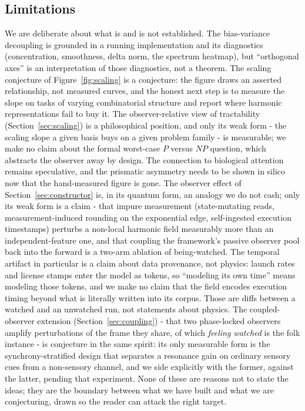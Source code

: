 \subsection{Limitations}

We are deliberate about what is and is not established. The bias-variance decoupling is grounded in a running implementation and its diagnostics (concentration, smoothness, delta norm, the spectrum heatmap), but ``orthogonal axes'' is an interpretation of those diagnostics, not a theorem. The scaling conjecture of Figure~\ref{fig:scaling} is a conjecture: the figure draws an asserted relationship, not measured curves, and the honest next step is to measure the slope on tasks of varying combinatorial structure and report where harmonic representations fail to buy it. The observer-relative view of tractability (Section~\ref{sec:scaling}) is a philosophical position, and only its weak form - the scaling slope a given basis buys on a given problem family - is measurable; we make no claim about the formal worst-case $P$ versus $NP$ question, which abstracts the observer away by design. The connection to biological attention remains speculative, and the prismatic asymmetry needs to be shown in silico now that the hand-measured figure is gone. The observer effect of Section~\ref{sec:constructor} is, in its quantum form, an analogy we do not cash; only its weak form is a claim - that impure measurement (state-mutating reads, measurement-induced rounding on the exponential edge, self-ingested execution timestamps) perturbs a non-local harmonic field measurably more than an independent-feature one, and that coupling the framework's passive observer pool back into the forward is a two-arm ablation of being-watched. The temporal artifact in particular is a claim about data provenance, not physics: launch rates and license stamps enter the model as tokens, so ``modeling its own time'' means modeling those tokens, and we make no claim that the field encodes execution timing beyond what is literally written into its corpus. Those are diffs between a watched and an unwatched run, not statements about physics. The coupled-observer extension (Section~\ref{sec:coupling}) - that two phase-locked observers amplify perturbations of the frame they share, of which \textit{feeling watched} is the folk instance - is conjecture in the same spirit: its only measurable form is the synchrony-stratified design that separates a resonance gain on ordinary sensory cues from a non-sensory channel, and we side explicitly with the former, against the latter, pending that experiment. None of these are reasons not to state the ideas; they are the boundary between what we have built and what we are conjecturing, drawn so the reader can attack the right target.

